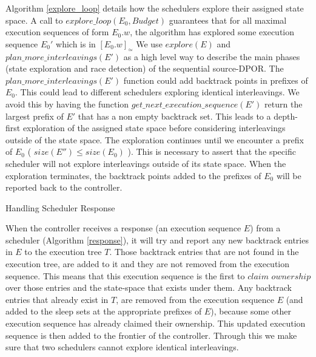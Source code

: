 Algorithm \ref{explore_loop} details how the schedulers explore their assigned state space.
A call to $explore\_loop(E_0, Budget)$ guarantees that for all maximal execution 
sequences of form $E_0.w$, the algorithm has explored some execution sequence $E_0'$ which is in $[E_0.w]_\simeq$ 
We use $explore(E)$ and 
$ plan\_more\_interleavings(E') $ as a high level way to describe the main phases (state exploration and 
race detection) of the sequential source-DPOR. The $ plan\_more\_interleavings(E') $ function
could add backtrack points in prefixes of $E_0$. This could lead to different schedulers exploring
identical interleavings. We avoid this by having 
the function $ get\_next\_execution\_sequence(E')$ return 
the largest prefix of $E'$ that has a non empty backtrack set. This leads to a depth-first exploration of the assigned
state space before considering interleavings outside of the state space. The exploration
continues until we encounter a prefix of $E_0$ ( $size(E'') \leq size(E_0)$ ). This is necessary to 
assert that the specific scheduler will not explore interleavings outside of its state space. When the exploration
terminates, the backtrack points added to the prefixes of $E_0$ will be reported back to the controller.

\begin{algorithm}
    \caption{Handling Scheduler Response}
    \label{response}
\end{algorithm}


When the controller receives a response (an execution sequence $E$) from a scheduler (Algorithm \ref{response}), it will 
try and report any new
backtrack entries in $E$ to the execution tree $T$. Those backtrack entries that are not found
in the execution tree, are added to it and they are not removed from the execution sequence. This means that 
this execution sequence is the first to $claim$ $ownership$ over those entries and the state-space
that exists under them. Any backtrack entries that already exist in $T$, are removed from the 
execution sequence $E$ (and added to the sleep sets at the appropriate prefixes of $E$),
because some other execution sequence has already claimed their ownership. This updated execution sequence is then 
added to the frontier of the controller. Through this we make sure that two schedulers cannot explore identical
interleavings.

